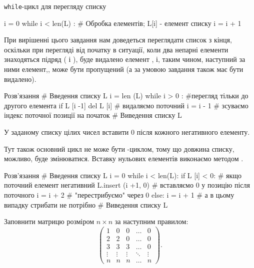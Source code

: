 \begin{defn}{\texttt{while}-цикл для перегляду списку}
\begin{py}{}
i = 0
while i < len(L) :
    # Обробка елементів; L[i] - елемент списку
    i = i + 1
\end{py}
\end{defn}

При вирішенні цього завдання нам доведеться переглядати список з кінця, оскільки при перегляді від початку в ситуації, коли два непарні елементи знаходяться підряд ( і ), буде видалено елемент , і, таким чином, наступний за ними елемент,, може бути пропущений (а за умовою завдання  також має бути видалено).

\begin{py}{Розв'язання}
# Введення списку L
i = len (L)
while i > 0 : #перегляд тільки до другого елемента
    if L [i -1] %
        del L [i] # видаляємо поточний
    i = i - 1 # зсуваємо індекс поточної позиції на початок
# Виведення списку L
\end{py}

\begin{pr}{}
У заданому списку цілих чисел вставити 0 після кожного негативного елементу.
\end{pr}

Тут також основний цикл не може бути -циклом, тому що довжина списку, можливо, буде змінюватися. Вставку нульових елементів виконаємо методом .

\begin{py}{Розв'язання}
# Введення списку L
i = 0
while i < len(L):
    if L [i] < 0: # якщо поточний елемент негативний
        L.insert (i +1, 0) # вставляємо 0 у позицію після поточного
        i = i + 2 # "перестрибуємо" через 0
    else:
        i = i + 1 # а в цьому випадку стрибати не потрібно
# Виведення списку L
\end{py}

\begin{pr}{}
Заповнити матрицю розміром $ n \times n $ за наступним правилом:
$$
\begin{pmatrix}
1 & 0 & 0 & \ldots & 0 \\
2 & 2 & 0 & \ldots & 0 \\
3 & 3 & 3 & \ldots & 0 \\
\vdots & \vdots & \vdots & \ddots & \vdots \\
n&n&n&\ldots&n
\end{pmatrix}.
$$
\end{pr}

